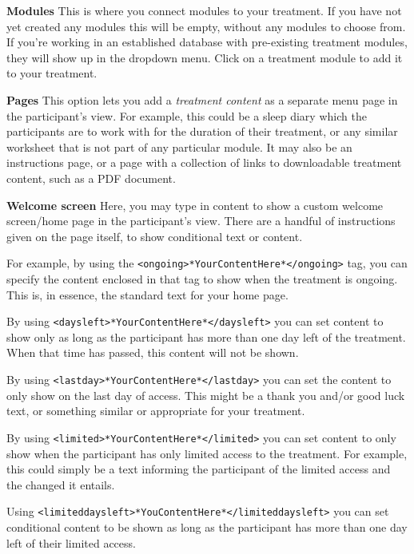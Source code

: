 \documentclass[
]{book}
\begin{document}
\textbf{Modules}
This is where you connect modules to your treatment. If you have not yet created any modules this will be empty, without any modules to choose from.
If you're working in an established database with pre-existing treatment modules, they will show up in the dropdown menu. Click on a treatment module to add it to your treatment.

\textbf{Pages}
This option lets you add a \emph{treatment content} as a separate menu page in the participant's view. For example, this could be a sleep diary which the participants are to work with for the duration of their treatment, or any similar worksheet that is not part of any particular module. It may also be an instructions page, or a page with a collection of links to downloadable treatment content, such as a PDF document.

\textbf{Welcome screen}
Here, you may type in content to show a custom welcome screen/home page in the participant's view. There are a handful of instructions given on the page itself, to show conditional text or content.

For example, by using the \texttt{\textless{}ongoing\textgreater{}*YourContentHere*\textless{}/ongoing\textgreater{}} tag, you can specify the content enclosed in that tag to show when the treatment is ongoing. This is, in essence, the standard text for your home page.

By using \texttt{\textless{}daysleft\textgreater{}*YourContentHere*\textless{}/daysleft\textgreater{}} you can set content to show only as long as the participant has more than one day left of the treatment. When that time has passed, this content will not be shown.

By using \texttt{\textless{}lastday\textgreater{}*YourContentHere*\textless{}/lastday\textgreater{}} you can set the content to only show on the last day of access. This might be a thank you and/or good luck text, or something similar or appropriate for your treatment.

By using \texttt{\textless{}limited\textgreater{}*YourContentHere*\textless{}/limited\textgreater{}} you can set content to only show when the participant has only limited access to the treatment. For example, this could simply be a text informing the participant of the limited access and the changed it entails.

Using \texttt{\textless{}limiteddaysleft\textgreater{}*YouContentHere*\textless{}/limiteddaysleft\textgreater{}} you can set conditional content to be shown as long as the participant has more than one day left of their limited access.
\end{document}

